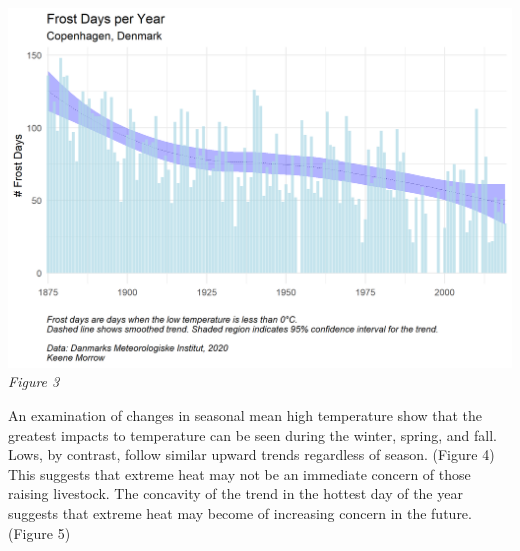 \documentclass[
]{article}
\begin{document}
\includegraphics{figures/frost_days.png} \emph{Figure 3}

An examination of changes in seasonal mean high temperature show that
the greatest impacts to temperature can be seen during the winter,
spring, and fall. Lows, by contrast, follow similar upward trends
regardless of season. (Figure 4) This suggests that extreme heat may not
be an immediate concern of those raising livestock. The concavity of the
trend in the hottest day of the year suggests that extreme heat may
become of increasing concern in the future. (Figure 5)
\end{document}
